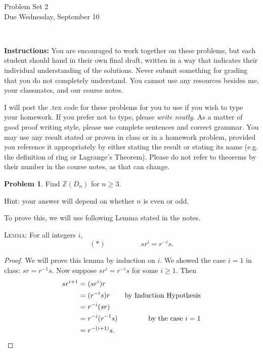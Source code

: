 \documentclass[11pt]{article}
\title{}
\date{\vspace{-0.5in}}
\newcommand{\Z}{\mathbb{Z}}
\theoremstyle{definition}
\newtheorem{problem}{Problem}
\begin{document}
\thispagestyle{fancy}
\pagestyle{fancy}

\vspace{3em}

\begin{center}
	{\LARGE Problem Set 2 \\}
	Due Wednesday, September 10
\end{center}

\

\noindent
{\bf Instructions:}
You are encouraged to work together on these problems, but each student should hand in their own final draft, written in a way that indicates their individual understanding of the solutions. Never submit something for grading that you do not completely understand. You cannot use any resources besides me, your classmates, and our course notes.


I will post the .tex code for these problems for you to use if you wish to type your homework. If you prefer not to type, please  {\em write neatly}. As a matter of good proof writing style, please use complete sentences and correct grammar. You may use any result stated or proven in class or in a homework problem, provided you reference it appropriately by either stating the result or stating its name (e.g. the definition of ring or Lagrange's Theorem). Please do not refer to theorems by their number in the course notes, as that can change.




\begin{problem}
Find $\Z(D_{n})$ for $n \geqslant 3$.  

\noindent Hint: your answer will depend on whether $n$ is even or odd.
\end{problem}

To prove this, we will use following Lemma stated in the notes.

\textsc{Lemma:}
For all integers $i$, 
$$(*) \hspace{5em} sr^i = r^{-i}s.$$ 


\begin{proof}
We will prove this lemma by induction on $i$. We showed the case $i=1$ in class: $sr = r^{-1}s$. Now suppose $sr^i = r^{-i}s$ for some $i \geqslant 1$. Then
$$\begin{aligned}
	sr^{i+1} & = (sr^i)r \\
	& = (r^{-i}s)r & \textrm{by Induction Hypothesis} \\
	& = r^{-i}(sr) \\
	& = r^{-i}(r^{-1}s) & \textrm{by the case } i =1 \\
	& = r^{-(i+1)} s. & \qedhere
\end{aligned}
$$
\end{proof}
\end{document}
